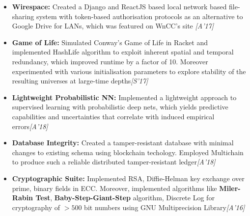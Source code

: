 \documentclass{article}
\begin{document}
\begin{itemize}[itemsep = -0.75 mm, leftmargin=*]
	\item \textbf{Wirespace:} Created a Django and ReactJS based local network based file-sharing system with token-based authorisation protocols as an alternative to Google Drive for LANs, which was featured on WnCC's site \hfill{\sl{\footnotesize{[A'17]}}}
	\item \textbf{Game of Life:} Simulated Conway's Game of Life in Racket and implemented HashLife algorithm to exploit inherent spatial and temporal redundancy, which improved runtime by a factor of 10. Moreover experimented with various initialisation parameters to explore stability of the resulting universes at large-time depths\hfill{\sl{\footnotesize{[S'17]}}}
	\item \textbf{Lightweight Probabilistic NN:} Implemented a lightweight approach to supervised learning with probabilistic deep nets, which yields predictive capabilities and uncertainties that correlate with induced empirical errors\hfill{\sl{\footnotesize{[A'18]}}}
	\item \textbf{Database Integrity:} Created a tamper-resistant database with minimal changes to existing schema using blockchain techology. Employed Multichain to produce such a reliable distributed tamper-resistant ledger\hfill{\sl{\footnotesize{[A'18]}}}
	\item \textbf{Cryptographic Suite:} Implemented RSA, Diffie-Helman key exchange over prime, binary fields in ECC. Moreover, implemented algorithms like \textbf{Miler-Rabin Test}, \textbf{Baby-Step-Giant-Step} algorithm, Discrete Log for cryptography of $>500$ bit numbers using GNU Multiprecision Library\hfill{\sl{\footnotesize{[A'16]}}}
\end{itemize}
\vspace{-6pt}

\end{document}
